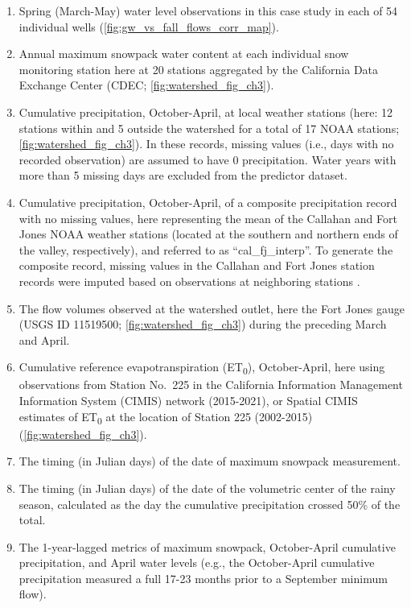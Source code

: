 \documentclass[hess, manuscript]{copernicus}
\providecommand{\tightlist}{%
  \setlength{\itemsep}{0pt}\setlength{\parskip}{0pt}}
\begin{document}
\begin{enumerate}
\def\labelenumi{\arabic{enumi}.}
\tightlist
\item
  Spring (March-May) water level observations in this case study in each
  of 54 individual wells (\autoref{fig:gw_vs_fall_flows_corr_map}).
\item
  Annual maximum snowpack water content at each individual snow
  monitoring station here at 20 stations aggregated by the California
  Data Exchange Center (CDEC; \autoref{fig:watershed_fig_ch3}).
\item
  Cumulative precipitation, October-April, at local weather stations
  (here: 12 stations within and 5 outside the watershed for a total of
  17 NOAA stations; \autoref{fig:watershed_fig_ch3}). In these records,
  missing values (i.e., days with no recorded observation) are assumed
  to have 0 precipitation. Water years with more than 5 missing days are
  excluded from the predictor dataset.
\item
  Cumulative precipitation, October-April, of a composite precipitation
  record with no missing values, here representing the mean of the
  Callahan and Fort Jones NOAA weather stations (located at the southern
  and northern ends of the valley, respectively), and referred to as
  ``cal\_fj\_interp''. To generate the composite record, missing values
  in the Callahan and Fort Jones station records were imputed based on
  observations at neighboring stations \citep[see method
  in][]{Foglia2013a}.
\item
  The flow volumes observed at the watershed outlet, here the Fort Jones
  gauge (USGS ID 11519500; \autoref{fig:watershed_fig_ch3}) during the
  preceding March and April.
\item
  Cumulative reference evapotranspiration (ET\textsubscript{0}),
  October-April, here using observations from Station No.~225 in the
  California Information Management Information System (CIMIS) network
  (2015-2021), or Spatial CIMIS estimates of ET\textsubscript{0} at the
  location of Station 225 (2002-2015) (\autoref{fig:watershed_fig_ch3}).
\item
  The timing (in Julian days) of the date of maximum snowpack
  measurement.
\item
  The timing (in Julian days) of the date of the volumetric center of
  the rainy season, calculated as the day the cumulative precipitation
  crossed 50\% of the total.
\item
  The 1-year-lagged metrics of maximum snowpack, October-April
  cumulative precipitation, and April water levels (e.g., the
  October-April cumulative precipitation measured a full 17-23 months
  prior to a September minimum flow).
\end{enumerate}
\end{document}
